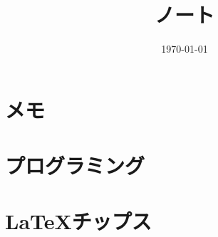 \documentclass[6pt]{jreport}
\title{ノート}
\author{}
\date{\today}
\begin{document}
\maketitle
\tableofcontents

\chapter{メモ}

\chapter{プログラミング}

%
\chapter{\LaTeX チップス}




\end{document}
